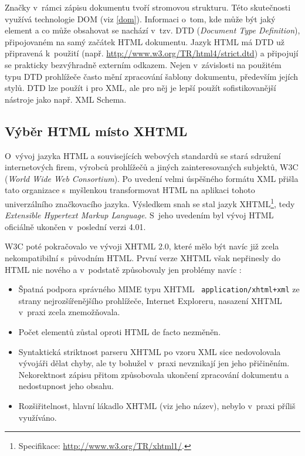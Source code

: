Značky v~rámci zápisu dokumentu tvoří stromovou strukturu. Této
skutečnosti využívá technologie DOM (viz \ref{dom}). Informaci
o~tom, kde může být jaký element a co může obsahovat se nachází
v~tzv. DTD ({\it Document Type Definition}), připojovaném na samý
začátek HTML dokumentu. Jazyk HTML má DTD už připravená k~použití
(např. \url{http://www.w3.org/TR/html4/strict.dtd}) a připojují se
prakticky bezvýhradně externím odkazem. Nejen v~závislosti na
použitém typu DTD prohlížeče často mění zpracování šablony dokumentu,
především jejích stylů. DTD lze použít i pro XML, ale pro něj je lepší
použít sofistikovanější nástroje jako např. XML Schema. 

\subsection{Výběr HTML místo XHTML}
O~vývoj jazyka HTML a souvisejících webových standardů se stará
sdružení internetových firem, výrobců prohlížečů a jiných
zainteresovaných subjektů, W3C ({\it World Wide Web Consortium}). Po
uvedení velmi úspěšného formátu XML přišla tato organizace
s~myšlenkou transformovat HTML na aplikaci tohoto univerzálního
značkovacího jazyka. Výsledkem snah se stal jazyk
XHTML\footnote{Specifikace: \url{http://www.w3.org/TR/xhtml1/}.}, tedy
{\it Extensible Hypertext Markup Language}. S~jeho uvedením byl vývoj
 HTML oficiálně ukončen v~poslední verzi 4.01.

W3C poté pokračovalo ve vývoji XHTML 2.0, které mělo být navíc již
zcela nekompatibilní s~původním HTML. První verze XHTML však
nepřinesly do HTML nic nového a v~podstatě způsobovaly jen problémy
navíc \cite{xhtml}:

\begin{itemize}
	\item Špatná podpora správného MIME typu XHTML {\tt
	application/xhtml+xml} ze strany nej\-rozšířenějšího prohlížeče,
	Internet Exploreru, nasazení  XHTML v~praxi zcela
	znemožňovala.
	\item Počet elementů zůstal oproti HTML de facto nezměněn.
	\item Syntaktická striktnost parseru XHTML po vzoru XML sice
	nedovolovala vývojáři dělat chyby, ale ty bohužel v~praxi nevznikají
	jen jeho přičiněním. Nekorektnost zápisu přitom způsobovala ukončení
	zpracování dokumentu a nedostupnost jeho obsahu.
	\item Rozšiřitelnost, hlavní lákadlo XHTML (viz jeho název), nebylo
	v~praxi příliš využíváno. 
\end{itemize}

